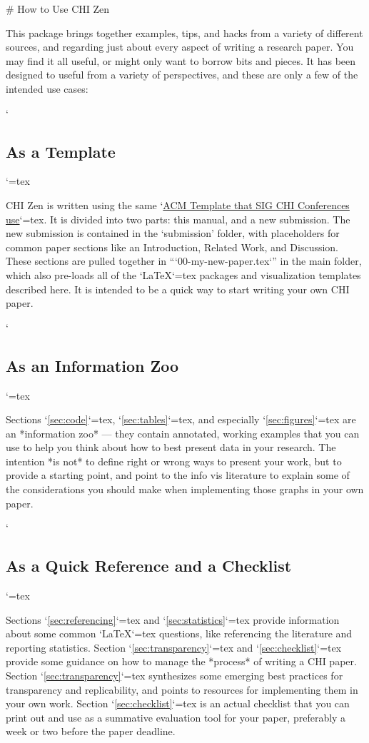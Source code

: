 \begin{markdown}
# How to Use CHI Zen

This package brings together examples, tips, and hacks from a variety of different sources, and regarding just about every aspect of writing a research paper. You may find it all useful, or might only want to borrow bits and pieces. It has been designed to useful from a variety of perspectives, and these are only a few of the intended use cases:  

`\subsection*{As a Template}`{=tex}

CHI Zen is written using the same `\href{https://www.acm.org/publications/authors/submissions}{ACM Template that SIG CHI Conferences use}`{=tex}. It is divided into two parts: this manual, and a new submission. The new submission is contained in the ‘submission’ folder, with placeholders for common paper sections like an Introduction, Related Work, and Discussion. These sections are pulled together in “`00-my-new-paper.tex`” in the main folder, which also pre-loads all of the `\LaTeX{}`{=tex} packages and visualization templates described here. It is intended to be a quick way to start writing your own CHI paper.

`\subsection*{As an Information Zoo}`{=tex}

Sections `\ref{sec:code}`{=tex}, `\ref{sec:tables}`{=tex}, and especially `\ref{sec:figures}`{=tex} are an *information zoo* --- they contain annotated, working examples that you can use to help you think about how to best present data in your research. The intention *is not* to define right or wrong ways to present your work, but to provide a starting point, and point to the info vis literature to explain some of the considerations you should make when implementing those graphs in your own paper.


`\subsection*{As a Quick Reference and a Checklist}`{=tex}

Sections `\ref{sec:referencing}`{=tex} and `\ref{sec:statistics}`{=tex} provide information about some common `\LaTeX{}`{=tex} questions, like referencing the literature and reporting statistics. Section `\ref{sec:transparency}`{=tex} and `\autoref{sec:checklist}`{=tex} provide some guidance on how to manage the *process* of writing a CHI paper. Section `\ref{sec:transparency}`{=tex} synthesizes some emerging best practices for transparency and replicability, and points to resources for implementing them in your own work. Section `\ref{sec:checklist}`{=tex} is an actual checklist that you can print out and use as a summative evaluation tool for your paper, preferably a week or two before the paper deadline. 



\end{markdown}
